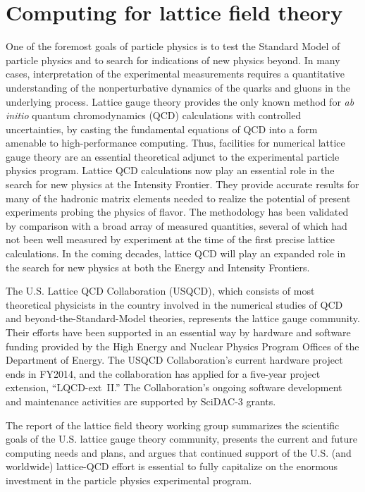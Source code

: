  
\section{Computing for lattice field theory}
\label{chap:LFT}


One of the foremost goals of particle physics is to test the Standard Model
of particle physics and to search for indications of new physics beyond. In
many cases, interpretation of the experimental measurements requires a
quantitative understanding of the nonperturbative dynamics of the quarks and
gluons in the underlying process.  Lattice gauge theory provides the only
known method for \emph{ab initio} quantum chromodynamics (QCD) calculations
with controlled uncertainties, by casting the fundamental equations of QCD
into a form amenable to high-performance computing.  Thus, facilities for
numerical lattice gauge theory are an essential theoretical adjunct to the
experimental particle physics program.  Lattice QCD calculations now play
an essential role in the search for new physics at the Intensity Frontier.
They provide accurate results for many of the hadronic matrix elements needed
to realize the potential of present experiments probing the physics of
flavor. The methodology has been validated by comparison with a broad array of
measured quantities, several of which had not been well measured by experiment
at the time of the first precise lattice
calculations.  In the coming decades, lattice QCD will
play an expanded role in the search for new physics at both the Energy and
Intensity Frontiers.

The U.S. Lattice QCD Collaboration (USQCD), which consists of
most theoretical physicists in the country involved in the numerical studies
of QCD and beyond-the-Standard-Model theories, represents the lattice gauge
community.  Their efforts have been supported in an essential way by hardware
and software funding provided by the High Energy and Nuclear Physics Program
Offices of the Department of Energy.  The USQCD Collaboration's current
hardware project ends in FY2014, and the collaboration has applied for a
five-year project extension, ``LQCD-ext~II.''  The Collaboration's ongoing
software development and maintenance activities are supported by SciDAC-3
grants.

The report of the lattice field theory working group summarizes the scientific
goals of the U.S. lattice gauge theory community, presents the current and
future computing needs and plans, and argues that continued support of the
U.S. (and worldwide) lattice-QCD effort is essential to fully capitalize on
the enormous investment in the particle physics experimental program.

